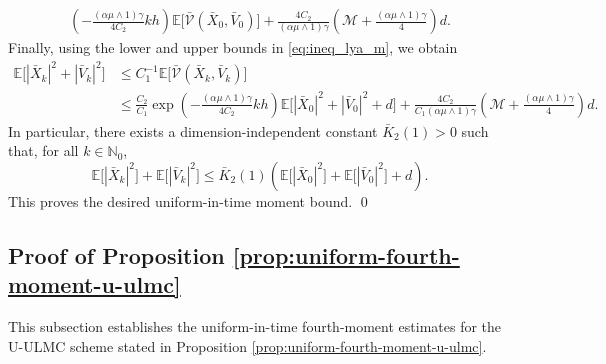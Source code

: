 \documentclass[12pt]{article}
\numberwithin{equation}{section}
\renewenvironment{proof}%
  {\begin{trivlist}%
   \item[]\ignorespaces}%
  {\qed\end{trivlist}}
\newcommand{\M}{\mathcal{M}}
\begin{document}
\begin{proof}
\begin{equation}
\begin{aligned}
\left(
-\tfrac{(\alpha\mu \wedge 1) \gamma}{4C_2}kh
\right)
\mathbb E
\Big[
\bar{\mathcal V}(\bar X_0,\bar V_0)
\Big]
+
\tfrac{4C_2}{(\alpha\mu \wedge 1) \gamma}
\left(
\M
+
\tfrac{(\alpha\mu \wedge 1) \gamma}{4}
\right)d .
\end{aligned}
\end{equation}
Finally, using the lower and upper bounds in \eqref{eq:ineq_lya_m}, we obtain
\begin{equation}
\label{eq:uniform-moment-bound-final}
\begin{aligned}
\mathbb E
\Big[
|\bar X_k|^2+|\bar V_k|^2
\Big]
&\leq
C_1^{-1}
\mathbb E
\Big[
\bar{\mathcal V}(\bar X_k,\bar V_k)
\Big]
\\
&\leq
\tfrac{C_2}{C_1}
\exp
\left(
-\tfrac{(\alpha\mu \wedge 1) \gamma}{4C_2}kh
\right)
\mathbb E
\Big[
|\bar X_0|^2+|\bar V_0|^2+d
\Big]
+
\tfrac{4C_2}{C_1 (\alpha\mu \wedge 1) \gamma}
\left(
\M
+
\tfrac{(\alpha\mu \wedge 1) \gamma}{4}
\right)d .
\end{aligned}
\end{equation}
In particular, there exists a dimension-independent constant $\bar{K}_2(1)>0$ such that, for all $k\in\mathbb N_0$,
\begin{equation}
\label{eq:uniform-moment-bound-compact}
\mathbb E
\Big[
|\bar X_k|^2
\Big]
+
\mathbb E
\Big[
|\bar V_k|^2
\Big]
\leq
\bar{K}_2(1)
\left(
\mathbb E
\Big[
|\bar X_0|^2
\Big]
+
\mathbb E
\Big[
|\bar V_0|^2
\Big]
+
d
\right).
\end{equation}
This proves the desired uniform-in-time moment bound.
\end{proof}




\subsection{Proof of Proposition \ref{prop:uniform-fourth-moment-u-ulmc}}
\label{sec:pf-scheme-4-th-bound}



This subsection establishes the uniform-in-time fourth-moment estimates for the U-ULMC scheme stated in Proposition \ref{prop:uniform-fourth-moment-u-ulmc}.
\end{document}
